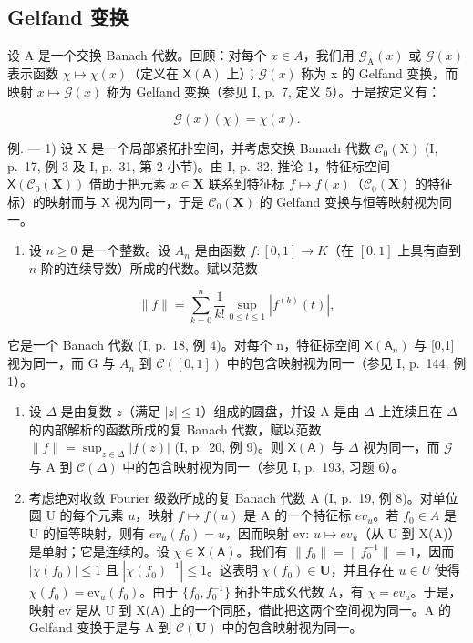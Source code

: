 \subsection{Gelfand 变换}

设 A 是一个交换 Banach 代数。回顾：对每个 \(x \in A\)，我们用 \(\mathcal{G}_{\mathrm{A}}(x)\) 或 \(\mathcal{G}(x)\) 表示函数 \(\chi \mapsto \chi(x)\)（定义在 \(\mathsf{X}(\mathsf{A})\) 上）；\(\mathcal{G}(x)\) 称为 x 的 Gelfand 变换，而映射 \(x \mapsto \mathcal{G}(x)\) 称为 Gelfand 变换（参见 I, p.~7, 定义 5）。于是按定义有：

\[
\mathcal {G} (x) (\chi) = \chi (x).
\]

例. --- 1) 设 X 是一个局部紧拓扑空间，并考虑交换 Banach 代数 \(\mathcal{C}_{0}(\mathrm{X})\) (I, p.~17, 例 3 及 I, p.~31, 第 2 小节)。由 I, p.~32, 推论 1，特征标空间 \(\mathsf{X}(\mathcal{C}_{0}(\mathbf{X}))\) 借助于把元素 \(x \in \mathbf{X}\) 联系到特征标 \(f \mapsto f(x)\)（\(\mathcal{C}_{0}(\mathbf{X})\) 的特征标）的映射而与 X 视为同一，于是 \(\mathcal{C}_{0}(\mathbf{X})\) 的 Gelfand 变换与恒等映射视为同一。

\begin{enumerate}
\def\labelenumi{\arabic{enumi})}
\setcounter{enumi}{1}
\tightlist
\item
  设 \(n \geqslant 0\) 是一个整数。设 \(A_n\) 是由函数 \(f: [0,1] \to K\)（在 \([0,1]\) 上具有直到 \(n\) 阶的连续导数）所成的代数。赋以范数
\end{enumerate}

\[
\| f \| = \sum_ {k = 0} ^ {n} \frac {1}{k !} \sup _ {0 \leqslant t \leqslant 1} | f ^ {(k)} (t) |,
\]

它是一个 Banach 代数 (I, p.~18, 例 4)。对每个 n，特征标空间 \(\mathsf{X}(\mathsf{A}_{n})\) 与 {[}0,1{]} 视为同一，而 G 与 \(A_{n}\) 到 \(\mathcal{C}([0,1])\) 中的包含映射视为同一（参见 I, p.~144, 例 1）。

\begin{enumerate}
\def\labelenumi{\arabic{enumi})}
\setcounter{enumi}{2}
\item
  设 \(\Delta\) 是由复数 \(z\)（满足 \(|z| \leqslant 1\)）组成的圆盘，并设 A 是由 \(\Delta\) 上连续且在 \(\Delta\) 的内部解析的函数所成的复 Banach 代数，赋以范数 \(\|f\| = \sup_{z \in \Delta} |f(z)|\) (I, p.~20, 例 9)。则 \(\mathsf{X}(\mathsf{A})\) 与 \(\Delta\) 视为同一，而 \(\mathcal{G}\) 与 A 到 \(\mathcal{C}(\Delta)\) 中的包含映射视为同一（参见 I, p.~193, 习题 6）。
\item
  考虑绝对收敛 Fourier 级数所成的复 Banach 代数 A (I, p.~19, 例 8)。对单位圆 U 的每个元素 \(u\)，映射 \(f \mapsto f(u)\) 是 A 的一个特征标 \(ev_{u}\)。若 \(f_{0} \in A\) 是 U 的恒等映射，则有 \(ev_{u}(f_{0}) = u\)，因而映射 ev: \(u \mapsto ev_{u}\)（从 U 到 X(A)）是单射；它是连续的。设 \(\chi \in \mathsf{X}(\mathsf{A})\)。我们有 \(\|f_{0}\| = \|f_{0}^{-1}\| = 1\)，因而 \(|\chi(f_{0})| \leqslant 1\) 且 \(|\chi(f_{0})^{-1}| \leqslant 1\)。这表明 \(\chi(f_{0}) \in \mathbf{U}\)，并且存在 \(u \in U\) 使得 \(\chi(f_{0}) = \mathrm{ev}_{u}(f_{0})\)。由于 \(\{f_{0}, f_{0}^{-1}\}\) 拓扑生成幺代数 A，有 \(\chi = ev_{u}\)。于是，映射 ev 是从 U 到 X(A) 上的一个同胚，借此把这两个空间视为同一。A 的 Gelfand 变换于是与 A 到 \(\mathcal{C}(\mathbf{U})\) 中的包含映射视为同一。
\end{enumerate}

